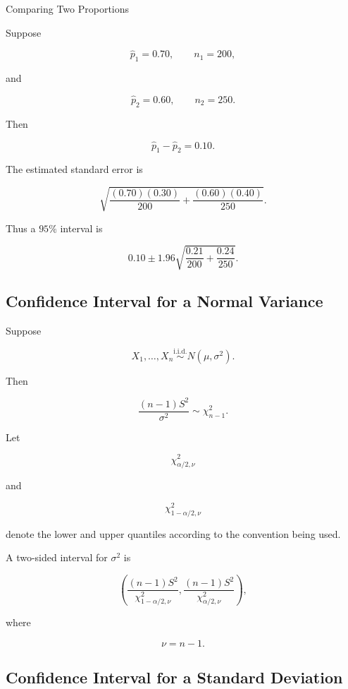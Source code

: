\begin{workedexamplebox}{Comparing Two Proportions}

Suppose

\[
\widehat{p}_1=0.70,
\qquad
n_1=200,
\]

and

\[
\widehat{p}_2=0.60,
\qquad
n_2=250.
\]

Then

\[
\widehat{p}_1-\widehat{p}_2
=
0.10.
\]

The estimated standard error is

\[
\sqrt{
\frac{
(0.70)(0.30)
}{200}
+
\frac{
(0.60)(0.40)
}{250}
}.
\]

Thus a \(95\%\) interval is

\begin{answerbox}
\[
\boxed{
0.10
\pm
1.96
\sqrt{
\frac{0.21}{200}
+
\frac{0.24}{250}
}.
}
\]
\end{answerbox}

\end{workedexamplebox}

\subsection{Confidence Interval for a Normal Variance}
\label{subsec:ci-normal-variance}

Suppose

\[
X_1,\ldots,X_n
\overset{\text{i.i.d.}}{\sim}
N(\mu,\sigma^2).
\]

Then

\[
\boxed{
\frac{
(n-1)S^2
}{
\sigma^2
}
\sim
\chi^2_{n-1}.
}
\]

Let

\[
\chi^2_{\alpha/2,\nu}
\]

and

\[
\chi^2_{1-\alpha/2,\nu}
\]

denote the lower and upper quantiles according to the convention being
used.

A two-sided interval for \(\sigma^2\) is

\[
\boxed{
\left(
\frac{
(n-1)S^2
}{
\chi^2_{1-\alpha/2,\nu}
},
\frac{
(n-1)S^2
}{
\chi^2_{\alpha/2,\nu}
}
\right),
}
\]

where

\[
\nu=n-1.
\]

\subsection{Confidence Interval for a Standard Deviation}
\label{subsec:ci-normal-standard-deviation}

